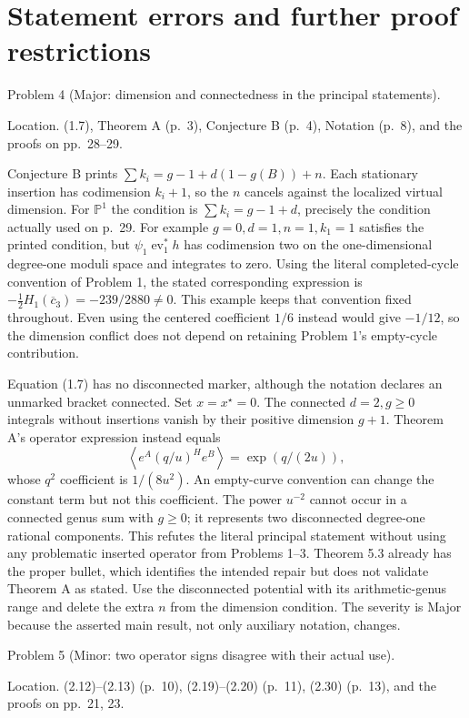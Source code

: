 \documentclass[10pt]{article}
\begin{document}
\section*{Statement errors and further proof restrictions}
Problem 4 (Major: dimension and connectedness in the principal statements).\par
Location. (1.7), Theorem A (p. 3), Conjecture B (p. 4), Notation (p. 8), and the proofs on pp. 28–29.\par
Conjecture B prints \(\sum k_i=g-1+d(1-g(B))+n\). Each stationary insertion has codimension \(k_i+1\), so the \(n\) cancels against the localized virtual dimension. For \(\mathbb P^1\) the condition is \(\sum k_i=g-1+d\), precisely the condition actually used on p. 29. For example \(g=0,d=1,n=1,k_1=1\) satisfies the printed condition, but \(\psi_1\operatorname{ev}_1^*h\) has codimension two on the one-dimensional degree-one moduli space and integrates to zero. Using the literal completed-cycle convention of Problem 1, the stated corresponding expression is \(-\tfrac12H_1(\overline c_3)=-239/2880\neq0\). This example keeps that convention fixed throughout. Even using the centered coefficient \(1/6\) instead would give \(-1/12\), so the dimension conflict does not depend on retaining Problem 1’s empty-cycle contribution.\par
Equation (1.7) has no disconnected marker, although the notation declares an unmarked bracket connected. Set \(x=x^\star=0\). The connected \(d=2,g\geq0\) integrals without insertions vanish by their positive dimension \(g+1\). Theorem A’s operator expression instead equals \[\left\langle e^A(q/u)^H e^B\right\rangle=\exp(q/(2u)),\] whose \(q^2\) coefficient is \(1/(8u^2)\). An empty-curve convention can change the constant term but not this coefficient. The power \(u^{-2}\) cannot occur in a connected genus sum with \(g\geq0\); it represents two disconnected degree-one rational components. This refutes the literal principal statement without using any problematic inserted operator from Problems 1–3. Theorem 5.3 already has the proper bullet, which identifies the intended repair but does not validate Theorem A as stated. Use the disconnected potential with its arithmetic-genus range and delete the extra \(n\) from the dimension condition. The severity is Major because the asserted main result, not only auxiliary notation, changes.\par
Problem 5 (Minor: two operator signs disagree with their actual use).\par
Location. (2.12)–(2.13) (p. 10), (2.19)–(2.20) (p. 11), (2.30) (p. 13), and the proofs on pp. 21, 23.\par
\end{document}
